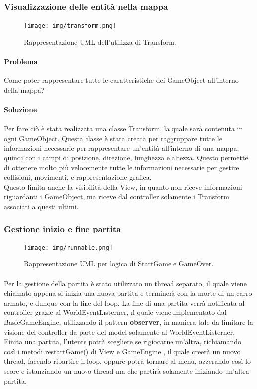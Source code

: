 \documentclass[a4paper,12pt]{report}
\begin{document}
\subsubsection*{Visualizzazione delle entità nella mappa}
%
\begin{figure}[H]
	\centering{}
	\texttt{[image: img/transform.png]}
	\caption{Rappresentazione UML dell'utilizza di Transform.}
	\label{img:strategy}
	\end{figure}
%
\paragraph*{Problema} Come poter rappresentare tutte le caratteristiche dei GameObject all’interno della mappa?
%
\paragraph*{Soluzione} Per fare ciò è stata realizzata una classe Transform, la quale sarà contenuta in ogni GameObject. Questa classe è stata creata per raggruppare tutte le informazioni necessarie per rappresentare un’entità all’interno di una mappa, quindi con i campi di posizione, direzione, lunghezza e altezza. Questo permette di ottenere molto più velocemente tutte le informazioni necessarie per gestire collisioni, movimenti, e rappresentazione grafica.\\
Questo limita anche la visibilità della View, in quanto non riceve informazioni riguardanti i GameObject, ma riceve dal controller solamente i Transform associati a questi ultimi.
\newpage
\subsubsection*{Gestione inizio e fine partita}
%
\begin{figure}[H]
	\centering{}
	\texttt{[image: img/runnable.png]}
	\caption{Rappresentazione UML per logica di StartGame e GameOver.}
	\label{img:strategy}
	\end{figure}
%
\paragraph{} Per la gestione della partita è stato utilizzato un thread separato, il quale viene chiamato appena si inizia una nuova partita e terminerà con la morte di un carro armato, e dunque con la fine del loop. La fine di una partita verrà notificata al controller grazie al WorldEventListerner, il quale viene implementato dal BasicGameEngine, utilizzando il pattern \textbf{observer}, in maniera tale da limitare la visione del controller da parte del model solamente al WorldEventListerner.\\
Finita una partita, l’utente potrà scegliere se rigiocarne un’altra, richiamando così i metodi restartGame() di View e GameEngine , il quale creerà un nuovo thread, facendo ripartire il loop, oppure potrà tornare al menu, azzerando così lo score e istanziando un nuovo thread ma che partirà solamente iniziando un’altra partita.
%
\newpage
\end{document}
